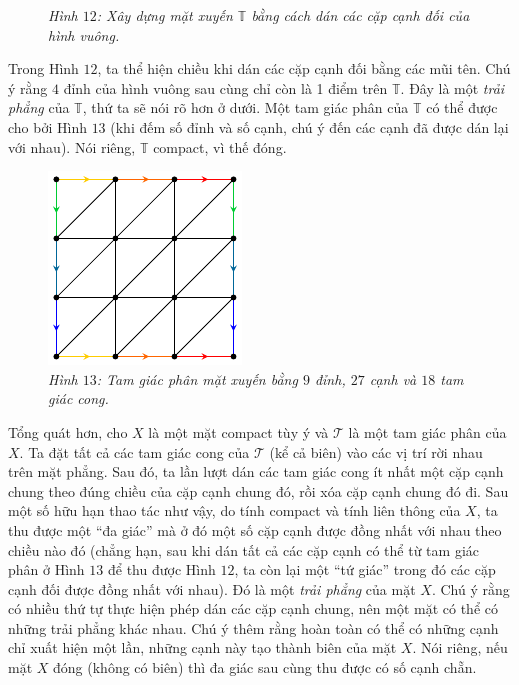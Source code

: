 \begin{multicols}{2}
\begin{figure}[H]
		\caption{\small\textit{\color{duongvaotoanhoc}Hình $12$: Xây dựng mặt xuyến $\mathbb{T}$ bằng cách dán các cặp cạnh đối của hình vuông.}}
		\vspace*{-10pt}
	\end{figure}
	Trong Hình $12$, ta thể hiện chiều khi dán các cặp cạnh đối bằng các mũi tên. Chú ý rằng $4$ đỉnh của hình vuông sau cùng chỉ còn là 1 điểm trên $\mathbb{T}$. Đây là một {\it trải phẳng} của $\mathbb{T}$, thứ ta sẽ nói rõ hơn ở dưới. Một tam giác phân của $\mathbb{T}$ có thể được cho bởi Hình $13$ (khi đếm số đỉnh và số cạnh, chú ý đến các cạnh đã được dán lại với nhau). Nói riêng, $\mathbb{T}$ compact, vì thế đóng.
	\begin{figure}[H]
		\vspace*{-5pt}
		\centering\captionsetup{labelformat=empty, justification=centering}
		\includegraphics[width=0.7\linewidth]{H13.pdf}
		\caption{\small\textit{\color{duongvaotoanhoc}Hình $13$: Tam giác phân mặt xuyến bằng $9$ đỉnh, $27$ cạnh và $18$ tam giác cong.}}
		\vspace*{-10pt}
	\end{figure}
	Tổng quát hơn, cho $X$ là một mặt compact tùy ý và $\mathscr{T}$ là một tam giác phân của $X$. Ta đặt tất cả các tam giác cong của $\mathscr{T}$ (kể cả biên) vào các vị trí rời nhau trên mặt phẳng. Sau đó, ta lần lượt dán các tam giác cong ít nhất một cặp cạnh chung theo đúng chiều của cặp cạnh chung đó, rồi xóa cặp cạnh chung đó đi. Sau một số hữu hạn thao tác như vậy, do tính compact và tính liên thông của $X$, ta thu được một ``đa giác'' mà ở đó một số cặp cạnh được đồng nhất với nhau theo chiều nào đó (chẳng hạn, sau khi dán tất cả các cặp cạnh có thể từ tam giác phân ở Hình $13$ để thu được Hình $12$, ta còn lại một ``tứ giác'' trong đó các cặp cạnh đối được đồng nhất với nhau). Đó là một {\it trải phẳng} của mặt $X$. Chú ý rằng có nhiều thứ tự thực hiện phép dán các cặp cạnh chung, nên một mặt có thể có những trải phẳng khác nhau. Chú ý thêm rằng hoàn toàn có thể có những cạnh chỉ xuất hiện một lần, những cạnh này tạo thành biên của mặt $X$. Nói riêng, nếu mặt $X$ đóng (không có biên) thì đa giác sau cùng thu được có số cạnh chẵn. 

\end{multicols}
